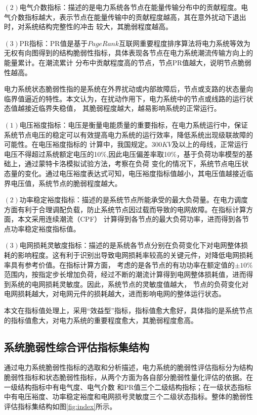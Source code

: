 $(2)$电气介数指标：描述的是电力系统各节点在能量传输分布中的贡献程度。电气介数指标越大，表示节点在能量传输中的贡献程度越高，其在意外扰动下退出时，对系统结构完整性的冲击
较大，其脆弱程度越高。

$(3)$PR指标：PR值是基于$PageRank$互联网重要程度排序算法将电力系统等效为无权有向图得到的结构脆弱性指标，具体表现各节点在电力系统潮流传输方向上的能量累计。在潮流累计
分布中贡献程度高的节点，节点PR值越大，说明节点脆弱性越高。

电力系统状态脆弱性指的是系统在外界扰动或内部故障后，节点或支路的状态量向临界值逼近的特性。本文认为，在扰动作用下，电力系统中的节点或线路的运行状态值越接近临界失稳值，
其脆弱程度越大，越易影响系统的正常运行。

$(1)$电压裕度指标：电压是衡量电能质量的重要指标，在电力系统运行中，保证系统节点电压的稳定可以有效提高电力系统的运行效率，降低系统出现级联故障的可能性。在电压裕度指标的
计算中，我国规定。300$KV$及以上的母线，正常运行电压不得超过系统额定电压的10$\%$,因此电压偏差率取10$\%$，基于负荷功率模型的基础上，通过蒙特卡洛模拟试验方法，考察在负荷
变化的情况下，系统节点电压状态量的变化。通过电压裕度表达式可知，电压裕度指标值越小，其电压值越接近临界电压值，系统节点的脆弱程度越大。

$(2)$功率稳定裕度指标：描述的是系统节点所能承受的最大负荷量。在电力调度方面有利于合理调配负载，防止系统节点因过载而导致的电网故障。在指标计算方面，本文采用连续潮流（CPF）
计算得到各节点的最大负荷功率，进而得到各节点功率稳定裕度指标值。

$(3)$电网损耗灵敏度指标：描述的是系统各节点分别在负荷变化下对电网整体损耗的影响程度。这有利于识别出导致电网损耗率较高的关键元件，对降低电网损耗率具有参考价值。在指标计算方面，
考虑的是各节点的有功功率在额定值的$\pm 10 \%$范围内，按指定步长增加负荷，经过不断的潮流计算得到电网整体损耗值，进而得到系统的电网损耗灵敏度。因此，系统节点的灵敏度值越大，
节点的负荷变化对电网损耗越大，对电网元件的损耗越大，进而影响电网的整体运行状态。

本文在指标值处理上，采用“效益型”指标，指标值愈大愈好，具体指的是系统节点的指标值愈大，对电力系统的重要程度愈大，其脆弱程度愈高。

\subsection{系统脆弱性综合评估指标集结构}
\label{sec:IndexSys}
通过电力系统脆弱性指标的选取和分析描述，电力系统的脆弱性评估指标分为结构脆弱性指标和状态脆弱性指标，从两个方面为各自部分脆弱性量化评估的依据。在一级结构指标中有电气度、电气介数
和PR值三个二级结构指标；在一级状态指标中有电压裕度、功率稳定裕度和电网损号灵敏度三个二级状态指标。整体的脆弱性评估指标集结构如图\ref{fig:index}所示。


